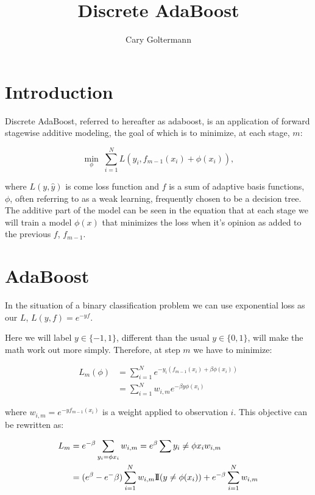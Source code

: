 \documentclass[a4paper, 12pt]{article}
\title{Discrete AdaBoost}
\author{Cary Goltermann}
\begin{document}
\maketitle

\section*{Introduction}
Discrete AdaBoost, referred to hereafter as adaboost, is an application of forward stagewise additive modeling, the goal of which is to minimize, at each stage, $m$:

$$ \min\limits_{\phi} \; \sum_{i=1}^N L(y_i, f_{m-1}(x_i) + \phi(x_i)), $$

where $L(y, \hat{y})$ is come loss function and $f$ is a sum of adaptive basis functions, $\phi$, often referring to as a weak learning, frequently chosen to be a decision tree.
\vspace{1em}
The additive part of the model can be seen in the equation that at each stage we will train a model $\phi(x)$ that minimizes the loss when it's opinion as added to the previous $f$, $f_{m-1}$.

\section*{AdaBoost}
In the situation of a binary classification problem we can use exponential loss as our $L$, $L(y, f) = e^{-yf}$.

\vspace{1em}
Here we will label $y \in \{-1, 1\}$, different than the usual $y \in \{0, 1\}$, will make the math work out more simply. Therefore, at step $m$ we have to minimize:

\begin{align*}
  L_m(\phi) &= \sum_{i=1}^N e^{-y_i(f_{m-1}(x_i) + \beta \phi(x_i))} \\
            &= \sum_{i=1}^N w_{i,m} e^{-\beta y \phi(x_i)}
\end{align*}

where $w_{i,m} = e^{-y f_{m-1}(x_i)}$ is a weight applied to observation $i$. This objective can be rewritten as:

\begin{align*}
  L_m &= e^{-\beta} \sum_{y_i=\phi{x_i}} w_{i,m} = e^\beta \sum{y_i \ne \phi{x_i}} w_{i,m} \\
      &= (e^\beta - e^-\beta) \sum_{i=1}^N w_{i,m} {\rm I\!I}(y \ne \phi(x_i)) + e^{-\beta} \sum_{i=1}^N w_{i,m}
\end{align*}
\end{document}
